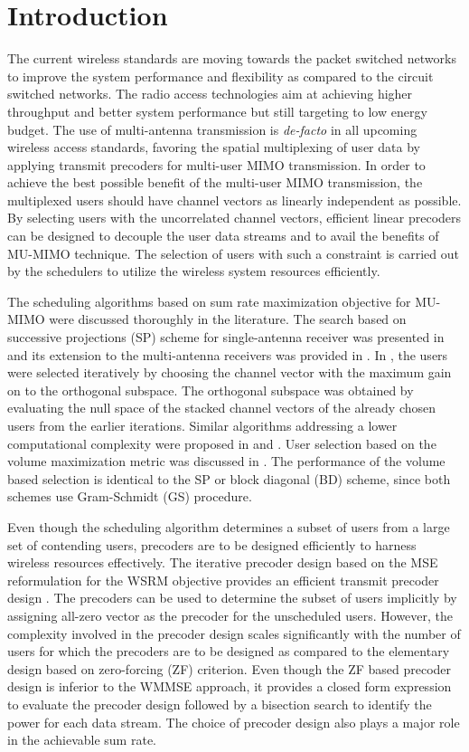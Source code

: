 \documentclass[conference,letterpaper]{./../../IEEE/IEEEtran}
\begin{document}
\section{Introduction}
The current wireless standards are moving towards the packet switched networks to improve the system performance and flexibility as compared to the circuit switched networks. The radio access technologies aim at achieving higher throughput and better system performance but still targeting to low energy budget. The use of multi-antenna transmission is \textit{de-facto} in all upcoming wireless access standards, favoring the spatial multiplexing of user data by applying transmit precoders for multi-user \ac{MIMO} transmission. In order to achieve the best possible benefit of the multi-user \ac{MIMO} transmission, the multiplexed users should have channel vectors as linearly independent as possible. By selecting users with the uncorrelated channel vectors, efficient linear precoders can be designed to decouple the user data streams and to avail the benefits of MU-MIMO technique. The selection of users with such a constraint is carried out by the schedulers to utilize the wireless system resources efficiently.

The scheduling algorithms based on sum rate maximization objective for MU-MIMO were discussed thoroughly in the literature. The search based on successive projections (SP) scheme for single-antenna receiver was presented in \cite{sus2006zfbf} and its extension to the multi-antenna receivers was provided in \cite{Tolli-etal-2005}. In \cite{Tolli-etal-2005}, the users were selected iteratively by choosing the channel vector with the maximum gain on to the orthogonal subspace. The orthogonal subspace was obtained by evaluating the null space of the stacked channel vectors of the already chosen users from the earlier iterations. Similar algorithms addressing a lower computational complexity were proposed in \cite{shen2006low} and \cite{youtuan2007improved}. User selection based on the volume maximization metric was discussed in \cite{jin2010novel}. The performance of the volume based selection is identical to the SP or block diagonal (BD) scheme, since both schemes use Gram-Schmidt (GS) procedure.

Even though the scheduling algorithm determines a subset of users from a large set of contending users, precoders are to be designed efficiently to harness wireless resources effectively. The iterative precoder design based on the \ac{MSE} reformulation for the \ac{WSRM} objective provides an efficient transmit precoder design \cite{wmmse_shi}. The precoders can be used to determine the subset of users implicitly by assigning all-zero vector as the precoder for the unscheduled users. However, the complexity involved in the precoder design scales significantly with the number of users for which the precoders are to be designed as compared to the elementary design based on zero-forcing (ZF) criterion. Even though the ZF based precoder design is inferior to the \ac{WMMSE} approach, it provides a closed form expression to evaluate the precoder design followed by a bisection search to identify the power for each data stream. The choice of precoder design also plays a major role in the achievable sum rate.
\end{document}
